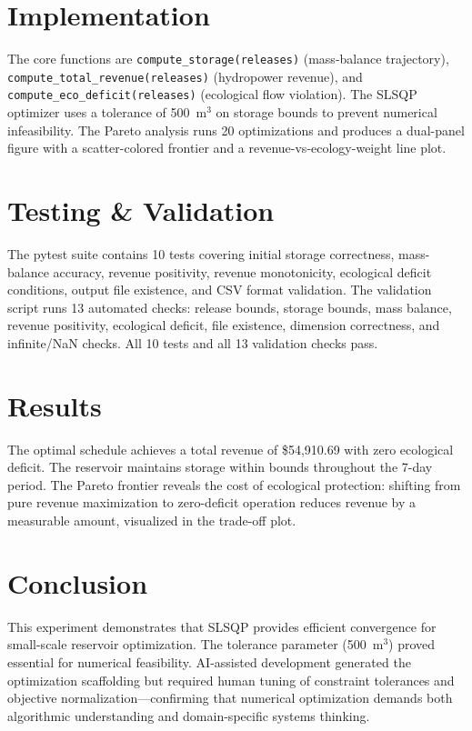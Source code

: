 \documentclass[12pt,a4paper]{article}
\begin{document}
\section{Implementation}
The core functions are \texttt{compute\_storage(releases)} (mass-balance trajectory), \texttt{compute\_total\_revenue(releases)} (hydropower revenue), and \texttt{compute\_eco\_deficit(releases)} (ecological flow violation). The SLSQP optimizer uses a tolerance of 500~m$^3$ on storage bounds to prevent numerical infeasibility. The Pareto analysis runs 20 optimizations and produces a dual-panel figure with a scatter-colored frontier and a revenue-vs-ecology-weight line plot.

\section{Testing \& Validation}
The pytest suite contains 10 tests covering initial storage correctness, mass-balance accuracy, revenue positivity, revenue monotonicity, ecological deficit conditions, output file existence, and CSV format validation. The validation script runs 13 automated checks: release bounds, storage bounds, mass balance, revenue positivity, ecological deficit, file existence, dimension correctness, and infinite/NaN checks. All 10 tests and all 13 validation checks pass.

\section{Results}
The optimal schedule achieves a total revenue of \$54,910.69 with zero ecological deficit. The reservoir maintains storage within bounds throughout the 7-day period. The Pareto frontier reveals the cost of ecological protection: shifting from pure revenue maximization to zero-deficit operation reduces revenue by a measurable amount, visualized in the trade-off plot.

\section{Conclusion}
This experiment demonstrates that SLSQP provides efficient convergence for small-scale reservoir optimization. The tolerance parameter (500~m$^3$) proved essential for numerical feasibility. AI-assisted development generated the optimization scaffolding but required human tuning of constraint tolerances and objective normalization—confirming that numerical optimization demands both algorithmic understanding and domain-specific systems thinking.
\end{document}
